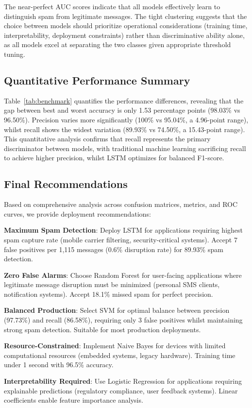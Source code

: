 \documentclass[a4paper,
               ]{jacow}
\begin{document}
The near-perfect AUC scores indicate that all models effectively learn to distinguish spam from legitimate messages. The tight clustering suggests that the choice between models should prioritize operational considerations (training time, interpretability, deployment constraints) rather than discriminative ability alone, as all models excel at separating the two classes given appropriate threshold tuning.

\subsection{Quantitative Performance Summary}

Table~\ref{tab:benchmark} quantifies the performance differences, revealing that the gap between best and worst accuracy is only 1.53 percentage points (98.03\% vs 96.50\%). Precision varies more significantly (100\% vs 95.04\%, a 4.96-point range), whilst recall shows the widest variation (89.93\% vs 74.50\%, a 15.43-point range). This quantitative analysis confirms that recall represents the primary discriminator between models, with traditional machine learning sacrificing recall to achieve higher precision, whilst LSTM optimizes for balanced F1-score.

\subsection{Final Recommendations}

Based on comprehensive analysis across confusion matrices, metrics, and ROC curves, we provide deployment recommendations:

\begin{Itemize}
    \item \textbf{Maximum Spam Detection}: Deploy LSTM for applications requiring highest spam capture rate (mobile carrier filtering, security-critical systems). Accept 7 false positives per 1,115 messages (0.6\% disruption rate) for 89.93\% spam detection.

    \item \textbf{Zero False Alarms}: Choose Random Forest for user-facing applications where legitimate message disruption must be minimized (personal SMS clients, notification systems). Accept 18.1\% missed spam for perfect precision.

    \item \textbf{Balanced Production}: Select SVM for optimal balance between precision (97.73\%) and recall (86.58\%), requiring only 3 false positives whilst maintaining strong spam detection. Suitable for most production deployments.

    \item \textbf{Resource-Constrained}: Implement Naive Bayes for devices with limited computational resources (embedded systems, legacy hardware). Training time under 1 second with 96.5\% accuracy.

    \item \textbf{Interpretability Required}: Use Logistic Regression for applications requiring explainable predictions (regulatory compliance, user feedback systems). Linear coefficients enable feature importance analysis.
\end{Itemize}
\end{document}
